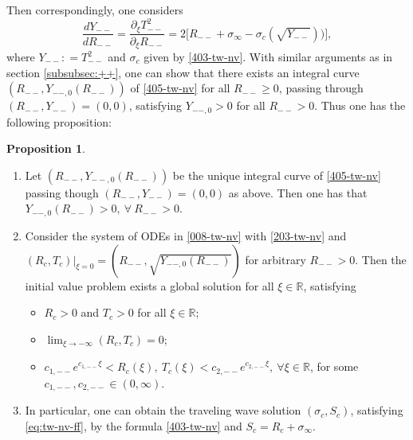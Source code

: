 \documentclass[12pt]{article}
\theoremstyle{definition}
\newtheorem{proposition}[theorem]{Proposition}
\theoremstyle{remark}
\numberwithin{equation}{section}
\begin{document}
Then correspondingly, one considers
\begin{equation}
    \label{405-tw-nv}
    \frac{d Y_{--}}{d R_{--}} = \frac{\partial_\xi T_{--}^2}{\partial_\xi R_{--}} = 2 \lbrack R_{--} + \sigma_\infty - \sigma_c( \sqrt{Y_{--}}) )\rbrack, 
\end{equation}
where $ Y_{--} : = T_{--}^2 $ and $ \sigma_c $ given by \eqref{403-tw-nv}. With similar arguments as in section \ref{subsubsec:++}, one can show that there exists an integral curve $ (R_{--}, Y_{--,0}(R_{--})) $ of \eqref{405-tw-nv} for all $ R_{--} \geq 0 $,  passing through $ (R_{--}, Y_{--}) = (0,0) $, satisfying  $ Y_{--,0} > 0 $ for all $ R_{--} > 0 $. Thus one has the following proposition:
\begin{proposition}
    \label{prop:tw--}
    \begin{enumerate}
    \item Let $ (R_{--}, Y_{{--},0}(R_{--}) ) $ be the unique integral curve of \eqref{405-tw-nv} passing though $ (R_{--}, Y_{--}) = (0,0) $ as above. Then one has that $ Y_{--,0}(R_{--}) > 0, \ \forall \ R_{--} > 0 $.   

    \item 
    Consider the system of ODEs in \eqref{008-tw-nv} with \eqref{203-tw-nv} and $ (R_c, T_c)\vert_{\xi = 0} = (R_{--}, \sqrt{Y_{--,0}(R_{--})}) $ for arbitrary $ R_{--} > 0 $. 
    Then the initial value problem exists a global solution for all $ \xi \in \mathbb R $, satisfying
    \begin{itemize}
        \item $ R_c > 0 $ and $ T_c > 0 $ for all $ \xi \in \mathbb R $; 
        \item $ \lim_{\xi\rightarrow -\infty} (R_c, T_c) = 0 $;
        \item $ c_{1,--} e^{ c_{1,--} \xi} < R_c(\xi) , \ T_c(\xi) < c_{2,--} e^{ c_{2,--} \xi}, \ \forall \xi \in \mathbb R $, for some $ c_{1,--}, c_{2,--} \in (0,\infty) $. 
    \end{itemize}

    \item
    In particular, one can obtain the traveling wave solution $ (\sigma_c, S_c) $, satisfying \eqref{eq:tw-nv-ff}, by the formula \eqref{403-tw-nv} and $ S_c = R_c + \sigma_\infty $. 
    \end{enumerate}
\end{proposition}
\end{document}
